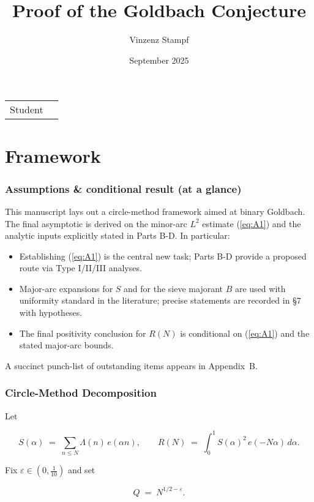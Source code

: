 \documentclass[11pt]{article}
\title{Proof of the Goldbach Conjecture}
\author{Vinzenz Stampf}
\date{September 2025}
\makeatletter
\def\eqref#1{(\ref{#1})}%
\theoremstyle{definition}
\theoremstyle{remark}
\numberwithin{equation}{part}
\providecommand{\theauthor}{\@author}
\makeatother
\begin{document}
\tableofcontents

\maketitle

\noindent\begin{tabular}{@{}ll}
	Student & \theauthor \\
\end{tabular}

\part{Framework}

\section{Assumptions \& conditional result (at a glance)}

This manuscript lays out a circle-method framework aimed at binary Goldbach. The final asymptotic is derived on the minor-arc $L^2$ estimate \eqref{eq:A1} and the analytic inputs explicitly stated in Parts B-D. In particular:

\begin{itemize}
	\item Establishing \eqref{eq:A1} is the central new task; Parts B-D provide a proposed route via Type I/II/III analyses.
	\item Major-arc expansions for $S$ and for the sieve majorant $B$ are used with uniformity standard in the literature; precise statements are recorded in §7 with hypotheses.
	\item The final positivity conclusion for $R(N)$ is conditional on \eqref{eq:A1} and the stated major-arc bounds.
\end{itemize}

A succinct punch-list of outstanding items appears in Appendix~B.

\section{Circle-Method Decomposition}

Let

$$
	S(\alpha)\;=\;\sum_{n\le N}\Lambda(n)\,e(\alpha n),\qquad
	R(N)\;=\;\int_{0}^{1} S(\alpha)^2\,e(-N\alpha)\,d\alpha .
$$

Fix $\varepsilon\in (0,\tfrac1{10})$ and set

$$
	Q \;=\; N^{1/2-\varepsilon}.
$$
\end{document}
